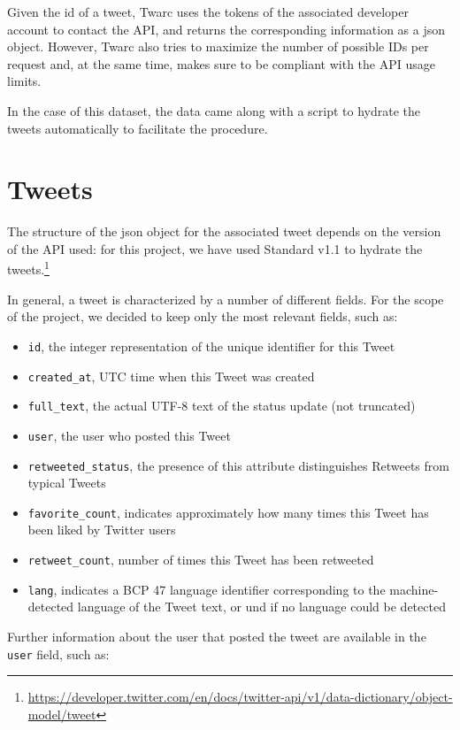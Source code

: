 Given the id of a tweet, Twarc uses the tokens of the associated developer account to contact the API, and returns the corresponding information as a json object. However, Twarc also tries to maximize the number of possible IDs per request and, at the same time, makes sure to be compliant with the API usage limits.

In the case of this dataset, the data came along with a script to hydrate the tweets automatically to facilitate the procedure.

\section{Tweets}
\label{sec:tweets}
The structure of the json object for the associated tweet depends on the version of the API used: for this project, we have used Standard v1.1 to hydrate the tweets.\footnote{\url{https://developer.twitter.com/en/docs/twitter-api/v1/data-dictionary/object-model/tweet}}

In general, a tweet is characterized by a number of different fields. For the scope of the project, we decided to keep only the most relevant fields, such as:

\begin{itemize}
	\item \texttt{id}, the integer representation of the unique identifier for this Tweet
	\item \texttt{created\_at}, UTC time when this Tweet was created
	\item \texttt{full\_text}, the actual UTF-8 text of the status update (not truncated)
	\item \texttt{user}, the user who posted this Tweet
	\item \texttt{retweeted\_status}, the presence of this attribute distinguishes Retweets from typical Tweets
	\item \texttt{favorite\_count}, indicates approximately how many times this Tweet has been liked by Twitter users
	\item \texttt{retweet\_count}, number of times this Tweet has been retweeted
	\item \texttt{lang}, indicates a BCP 47 language identifier corresponding to the machine-detected language of the Tweet text, or und if no language could be detected
\end{itemize}

Further information about the user that posted the tweet are available in the \texttt{user} field, such as:

